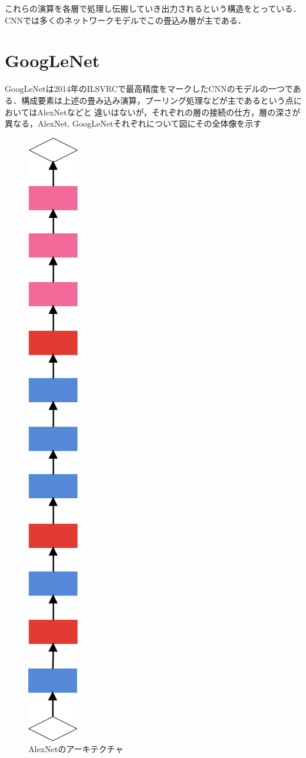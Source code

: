 {これらの演算を各層で処理し伝搬していき出力されるという構造をとっている．
CNNでは多くのネットワークモデルでこの畳込み層が主である．

\section{GoogLeNet}
\label{sec:googlenet}
GoogLeNetは2014年のILSVRCで最高精度をマークしたCNNのモデルの一つである．構成要素は上述の畳み込み演算，プーリング処理などが主であるという点においてはAlexNetなどと
違いはないが，それぞれの層の接続の仕方，層の深さが異なる，AlexNet, GoogLeNetそれぞれについて図にその全体像を示す

\begin{figure}[h]
  \centering
  \includegraphics[scale=0.5]{./chap2/fig/alexnet.png}
  \caption{AlexNetのアーキテクチャ}
  \label{fig:alexnet}
\end{figure}

}
